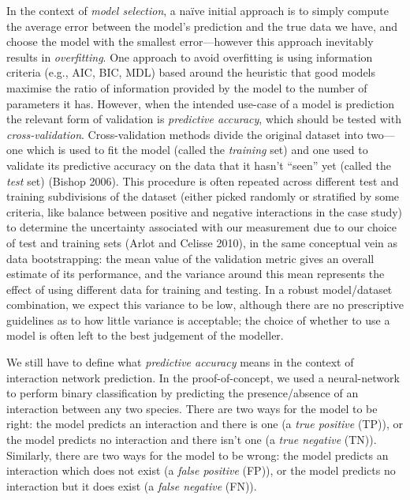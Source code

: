 \documentclass[10pt,oneside]{article}
\begin{document}
In the context of \emph{model selection}, a naïve initial approach is to
simply compute the average error between the model's prediction and the
true data we have, and choose the model with the smallest
error---however this approach inevitably results in \emph{overfitting}.
One approach to avoid overfitting is using information criteria (e.g.,
AIC, BIC, MDL) based around the heuristic that good models maximise the
ratio of information provided by the model to the number of parameters
it has. However, when the intended use-case of a model is prediction the
relevant form of validation is \emph{predictive accuracy}, which should
be tested with \emph{cross-validation}. Cross-validation methods divide
the original dataset into two---one which is used to fit the model
(called the \emph{training} set) and one used to validate its predictive
accuracy on the data that it hasn't ``seen'' yet (called the \emph{test}
set) (Bishop 2006). This procedure is often repeated across different
test and training subdivisions of the dataset (either picked randomly or
stratified by some criteria, like balance between positive and negative
interactions in the case study) to determine the uncertainty associated
with our measurement due to our choice of test and training sets (Arlot
and Celisse 2010), in the same conceptual vein as data bootstrapping:
the mean value of the validation metric gives an overall estimate of its
performance, and the variance around this mean represents the effect of
using different data for training and testing. In a robust model/dataset
combination, we expect this variance to be low, although there are no
prescriptive guidelines as to how little variance is acceptable; the
choice of whether to use a model is often left to the best judgement of
the modeller.

We still have to define what \emph{predictive accuracy} means in the
context of interaction network prediction. In the proof-of-concept, we
used a neural-network to perform binary classification by predicting the
presence/absence of an interaction between any two species. There are
two ways for the model to be right: the model predicts an interaction
and there is one (a \emph{true positive} (TP)), or the model predicts no
interaction and there isn't one (a \emph{true negative} (TN)).
Similarly, there are two ways for the model to be wrong: the model
predicts an interaction which does not exist (a \emph{false positive}
(FP)), or the model predicts no interaction but it does exist (a
\emph{false negative} (FN)).
\end{document}
